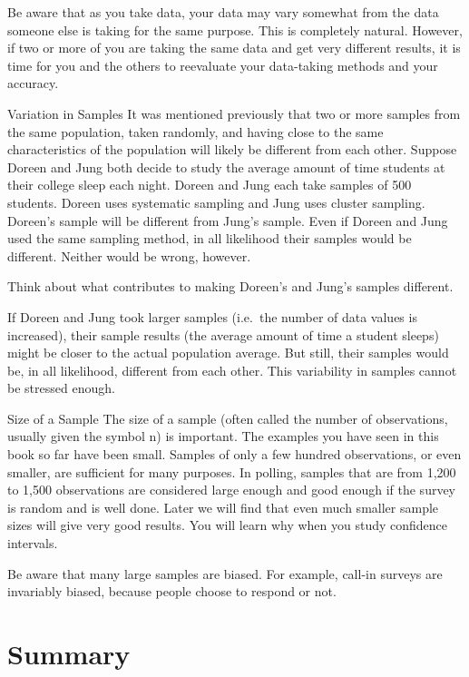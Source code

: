 \documentclass[
  letterpaper,
  DIV=11,
  numbers=noendperiod]{scrreprt}
\begin{document}
Be aware that as you take data, your data may vary somewhat from the
data someone else is taking for the same purpose. This is completely
natural. However, if two or more of you are taking the same data and get
very different results, it is time for you and the others to reevaluate
your data-taking methods and your accuracy.

Variation in Samples It was mentioned previously that two or more
samples from the same population, taken randomly, and having close to
the same characteristics of the population will likely be different from
each other. Suppose Doreen and Jung both decide to study the average
amount of time students at their college sleep each night. Doreen and
Jung each take samples of 500 students. Doreen uses systematic sampling
and Jung uses cluster sampling. Doreen's sample will be different from
Jung's sample. Even if Doreen and Jung used the same sampling method, in
all likelihood their samples would be different. Neither would be wrong,
however.

Think about what contributes to making Doreen's and Jung's samples
different.

If Doreen and Jung took larger samples (i.e.~the number of data values
is increased), their sample results (the average amount of time a
student sleeps) might be closer to the actual population average. But
still, their samples would be, in all likelihood, different from each
other. This variability in samples cannot be stressed enough.

Size of a Sample The size of a sample (often called the number of
observations, usually given the symbol n) is important. The examples you
have seen in this book so far have been small. Samples of only a few
hundred observations, or even smaller, are sufficient for many purposes.
In polling, samples that are from 1,200 to 1,500 observations are
considered large enough and good enough if the survey is random and is
well done. Later we will find that even much smaller sample sizes will
give very good results. You will learn why when you study confidence
intervals.

Be aware that many large samples are biased. For example, call-in
surveys are invariably biased, because people choose to respond or not.


\chapter{Summary}\label{summary}
\end{document}
